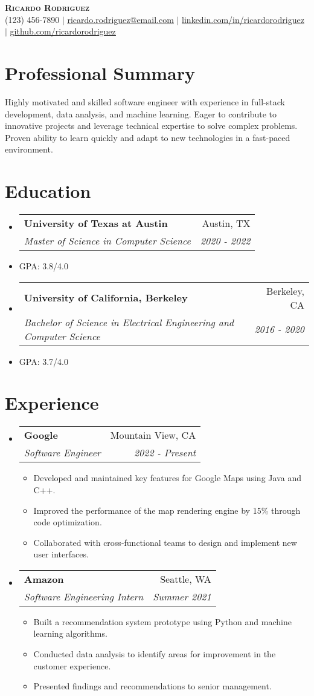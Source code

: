 \documentclass[letterpaper,11pt]{article}
\makeatletter
\newcommand{\resumeItem}[1]{
\item\small{
{#1 \vspace{-2pt}}
}
}
\newcommand{\resumeSubheading}[4]{
\vspace{-2pt}\item
\begin{tabular*}{0.97\textwidth}[t]{l@{\extracolsep{\fill}}r}
\textbf{#1} & #2 \\
\textit{\small#3} & \textit{\small #4} \\
\end{tabular*}\vspace{-7pt}
}
\newcommand{\resumeSubItem}[1]{\resumeItem{#1}\vspace{-4pt}}
\newcommand{\resumeSubHeadingListStart}{\begin{itemize}[leftmargin=0.15in, label={}]}
\newcommand{\resumeSubHeadingListEnd}{\end{itemize}}
\newcommand{\resumeItemListStart}{\begin{itemize}}
\newcommand{\resumeItemListEnd}{\end{itemize}\vspace{-5pt}}
\makeatother
\begin{document}
\begin{center}
\textbf{\Huge \scshape Ricardo Rodriguez} \\ \vspace{1pt}
\small (123) 456-7890 $|$ \href{mailto:ricardo.rodriguez@email.com}{\underline{ricardo.rodriguez@email.com}} $|$
\href{https://linkedin.com/in/ricardorodriguez}{\underline{linkedin.com/in/ricardorodriguez}} $|$
\href{https://github.com/ricardorodriguez}{\underline{github.com/ricardorodriguez}}
\end{center}


\section{Professional Summary} %
Highly motivated and skilled software engineer with experience in full-stack development, data analysis, and machine learning. Eager to contribute to innovative projects and leverage technical expertise to solve complex problems. Proven ability to learn quickly and adapt to new technologies in a fast-paced environment.

\section{Education}
\resumeSubHeadingListStart
\resumeSubheading{University of Texas at Austin}{Austin, TX}{Master of Science in Computer Science}{2020 - 2022}
\resumeSubItem{GPA: 3.8/4.0}
\resumeSubheading{University of California, Berkeley}{Berkeley, CA}{Bachelor of Science in Electrical Engineering and Computer Science}{2016 - 2020}
\resumeSubItem{GPA: 3.7/4.0}
\resumeSubHeadingListEnd

\section{Experience}
\resumeSubHeadingListStart
\resumeSubheading{Google}{Mountain View, CA}{Software Engineer}{2022 - Present}
\resumeItemListStart
\resumeItem{Developed and maintained key features for Google Maps using Java and C++.}
\resumeItem{Improved the performance of the map rendering engine by 15\% through code optimization.}
\resumeItem{Collaborated with cross-functional teams to design and implement new user interfaces.}
\resumeItemListEnd
\resumeSubheading{Amazon}{Seattle, WA}{Software Engineering Intern}{Summer 2021}
\resumeItemListStart
\resumeItem{Built a recommendation system prototype using Python and machine learning algorithms.}
\resumeItem{Conducted data analysis to identify areas for improvement in the customer experience.}
\resumeItem{Presented findings and recommendations to senior management.}
\resumeItemListEnd
\resumeSubHeadingListEnd
\end{document}
